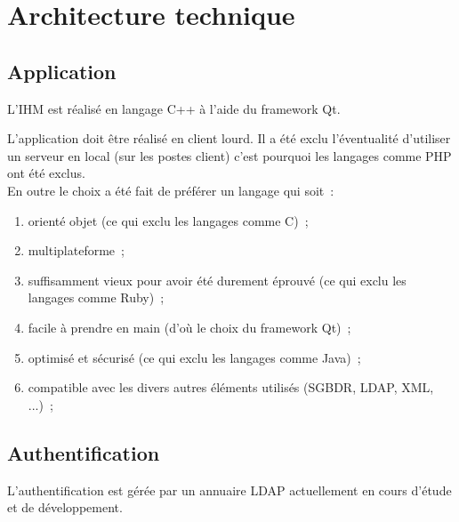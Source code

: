 \chapter{Architecture technique}

% 

\section{Application}
L'IHM est réalisé en langage C++ à l'aide du framework Qt.
\begin{notation}
L'application doit être réalisé en client lourd. Il a été exclu l'éventualité d'utiliser un serveur en local (sur les postes client) c'est pourquoi les langages comme PHP ont été exclus. \\
En outre le choix a été fait de préférer un langage qui soit~:
\begin{enumerate}
	\item orienté objet (ce qui exclu les langages comme C)~;
	\item multiplateforme~;
	\item suffisamment vieux pour avoir été durement éprouvé (ce qui exclu les langages comme Ruby)~;
	\item facile à prendre en main (d'où le choix du framework Qt)~;
	\item optimisé et sécurisé (ce qui exclu les langages comme Java)~;
	\item compatible avec les divers autres éléments utilisés (SGBDR, LDAP, XML, ...)~;
\end{enumerate}
\end{notation}

\section{Authentification}
L'authentification est gérée par un annuaire LDAP actuellement en cours d'étude et de développement.

\clearpage


\clearpage


\clearpage


\clearpage
